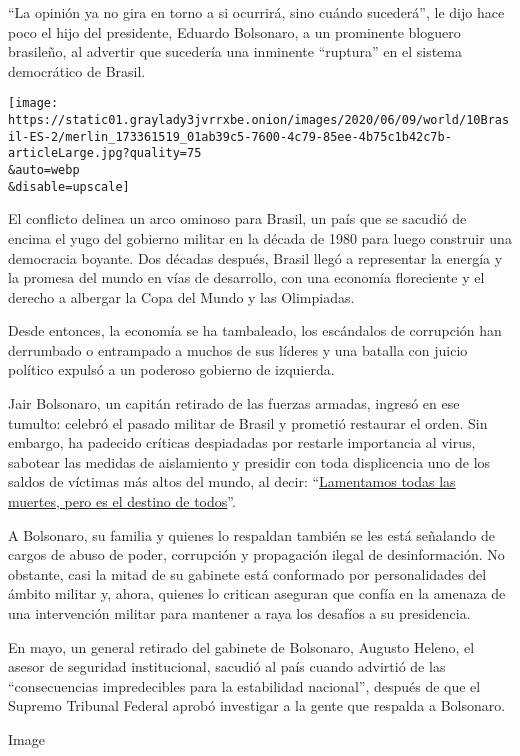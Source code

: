 ``La opinión ya no gira en torno a si ocurrirá, sino cuándo sucederá'',
le dijo hace poco el hijo del presidente, Eduardo Bolsonaro, a un
prominente bloguero brasileño, al advertir que sucedería una inminente
``ruptura'' en el sistema democrático de Brasil.

\texttt{[image: https://static01.graylady3jvrrxbe.onion/images/2020/06/09/world/10Brasil-ES-2/merlin\_173361519\_01ab39c5-7600-4c79-85ee-4b75c1b42c7b-articleLarge.jpg?quality=75\\\&auto=webp\\\&disable=upscale]}

El conflicto delinea un arco ominoso para Brasil, un país que se sacudió
de encima el yugo del gobierno militar en la década de 1980 para luego
construir una democracia boyante. Dos décadas después, Brasil llegó a
representar la energía y la promesa del mundo en vías de desarrollo, con
una economía floreciente y el derecho a albergar la Copa del Mundo y las
Olimpiadas.

Desde entonces, la economía se ha tambaleado, los escándalos de
corrupción han derrumbado o entrampado a muchos de sus líderes y una
batalla con juicio político expulsó a un poderoso gobierno de izquierda.

Jair Bolsonaro, un capitán retirado de las fuerzas armadas, ingresó en
ese tumulto: celebró el pasado militar de Brasil y prometió restaurar el
orden. Sin embargo, ha padecido críticas despiadadas por restarle
importancia al virus, sabotear las medidas de aislamiento y presidir con
toda displicencia uno de los saldos de víctimas más altos del mundo, al
decir:
``\href{https://www.nytimes3xbfgragh.onion/2020/06/04/world/middleeast/coronavirus-egypt-america-africa-asia.html}{Lamentamos
todas las muertes, pero es el destino de todos}''.

A Bolsonaro, su familia y quienes lo respaldan también se les está
señalando de cargos de abuso de poder, corrupción y propagación ilegal
de desinformación. No obstante, casi la mitad de su gabinete está
conformado por personalidades del ámbito militar y, ahora, quienes lo
critican aseguran que confía en la amenaza de una intervención militar
para mantener a raya los desafíos a su presidencia.

En mayo, un general retirado del gabinete de Bolsonaro, Augusto Heleno,
el asesor de seguridad institucional, sacudió al país cuando advirtió de
las ``consecuencias impredecibles para la estabilidad nacional'',
después de que el Supremo Tribunal Federal aprobó investigar a la gente
que respalda a Bolsonaro.

Image


